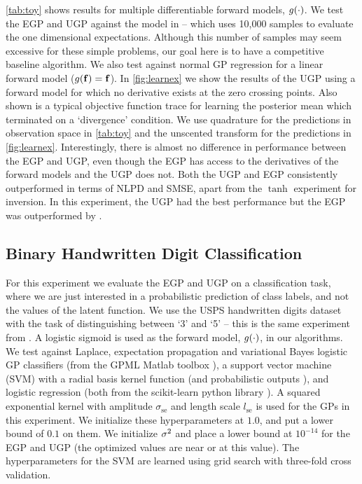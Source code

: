\documentclass{article} %
\begin{document}
\autoref{tab:toy} shows results for multiple differentiable forward models,
$g\!\left({{\cdot}}\right)$. We test the EGP and UGP against the model in \cite{Opper2009}
-- which uses 10,000 samples to evaluate the one dimensional expectations. 
Although this number of samples may seem excessive for these simple problems, our goal
here is to have a competitive baseline algorithm. 
We also test against normal GP
regression for a linear forward model ($g\!\left({{\mathbf{f}}}\right) = \mathbf{f}$). In
\autoref{fig:learnex} we show the results of the UGP using a forward model for
which no derivative exists at the zero crossing points. Also shown is a typical
objective function trace for learning the posterior mean which terminated on a
`divergence' condition. We use quadrature for the predictions in observation
space in \autoref{tab:toy} and the unscented transform for the predictions in
\autoref{fig:learnex}. Interestingly, there is almost no difference in
performance between the EGP and UGP, even though the EGP has access to the
derivatives of the forward models and the UGP does not. 
Both the UGP and EGP
consistently outperformed \cite{Opper2009} in terms of  NLPD and  SMSE, 
apart from the $\tanh$ experiment for inversion. In this experiment, 
the UGP had the best performance but the EGP was outperformed by  \cite{Opper2009}.



\subsection{Binary Handwritten Digit Classification}

For this experiment we evaluate the EGP and UGP on a %
classification task, where we are just interested in a probabilistic prediction
of class labels, and not the values of the latent function. We use 
the USPS handwritten digits dataset with the task of distinguishing between
`3' and `5' -- this is the same experiment from \citep[][ \S 3.7.3]{Rasmussen2006}. A
logistic sigmoid is used as the forward model, $g\!\left({{\cdot}}\right)$, in our
algorithms. We test against Laplace, expectation propagation and variational
Bayes logistic GP classifiers (from the GPML Matlab toolbox
\cite{Rasmussen2006}), a support vector machine (SVM) with a radial basis
kernel function (and probabilistic outputs \cite{Platt1999}), and logistic
regression (both from the scikit-learn python library \cite{scikit-learn}). A
squared exponential kernel with amplitude $\sigma_\text{se}$ and length scale
$l_\text{se}$ is used for the GPs in this experiment. We initialize these
hyperparameters at $1.0$, and put a lower bound of $0.1$ on them. We initialize
$\sigma^2$ and place a lower bound at $10^{-14}$ for the EGP and UGP (the
optimized values are near or at this value). The hyperparameters for the SVM
are learned using grid search with three-fold cross validation. 
\end{document}
